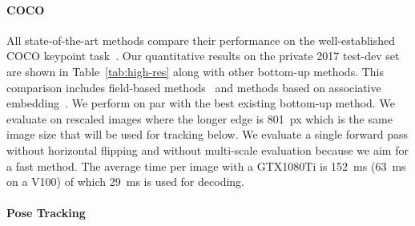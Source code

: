 \documentclass[journal]{IEEEtran}
\begin{document}
\paragraph{COCO}
All state-of-the-art methods compare their performance on the well-established
COCO keypoint task~\cite{lin2014microsoft}.
Our quantitative results on the private 2017 test-dev set are shown
in Table~\ref{tab:high-res} along with other bottom-up methods.
This comparison includes field-based
methods~\cite{cao2017realtime,papandreou2018personlab,kreiss2019pifpaf}
and methods based on associative
embedding~\cite{newell2017associative,cheng2020higherhrnet}.
We perform on par with the best existing
bottom-up method.
We evaluate on rescaled images where the longer edge is 801~px which is the
same image size that will be used for tracking below. We evaluate a single
forward pass without horizontal flipping and without multi-scale evaluation because
we aim for a fast method.
The average time per image with a GTX1080Ti is 152~ms (63~ms on a V100) of which 29~ms
is used for decoding.





\paragraph{Pose Tracking}
\end{document}
